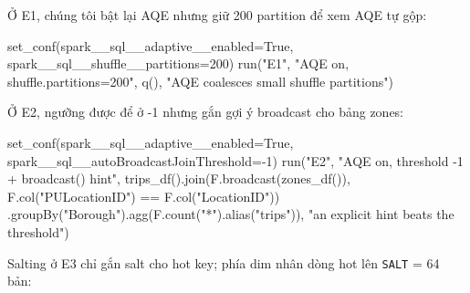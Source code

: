 \documentclass[
  12pt,
  a4paper,
]{article}
\newenvironment{Shaded}{}{}
\newcommand{\DecValTok}[1]{\textcolor[rgb]{0.25,0.63,0.44}{#1}}
\newcommand{\NormalTok}[1]{#1}
\newcommand{\OperatorTok}[1]{\textcolor[rgb]{0.40,0.40,0.40}{#1}}
\newcommand{\StringTok}[1]{\textcolor[rgb]{0.25,0.44,0.63}{#1}}
\newcommand{\VariableTok}[1]{\textcolor[rgb]{0.10,0.09,0.49}{#1}}
\begin{document}
Ở E1, chúng tôi bật lại AQE nhưng giữ 200 partition để xem AQE tự gộp:

\begin{Shaded}
\begin{Highlighting}[]
\NormalTok{set\_conf(spark\_\_sql\_\_adaptive\_\_enabled}\OperatorTok{=}\VariableTok{True}\NormalTok{, spark\_\_sql\_\_shuffle\_\_partitions}\OperatorTok{=}\DecValTok{200}\NormalTok{)}
\NormalTok{run(}\StringTok{"E1"}\NormalTok{, }\StringTok{"AQE on,  shuffle.partitions=200"}\NormalTok{, q(), }\StringTok{"AQE coalesces small shuffle partitions"}\NormalTok{)}
\end{Highlighting}
\end{Shaded}

Ở E2, ngưỡng được để ở -1 nhưng gắn gợi ý broadcast cho bảng zones:

\begin{Shaded}
\begin{Highlighting}[]
\NormalTok{set\_conf(spark\_\_sql\_\_adaptive\_\_enabled}\OperatorTok{=}\VariableTok{True}\NormalTok{, spark\_\_sql\_\_autoBroadcastJoinThreshold}\OperatorTok{={-}}\DecValTok{1}\NormalTok{)}
\NormalTok{run(}\StringTok{"E2"}\NormalTok{, }\StringTok{"AQE on,  threshold {-}1 + broadcast() hint"}\NormalTok{,}
\NormalTok{    trips\_df().join(F.broadcast(zones\_df()), F.col(}\StringTok{"PULocationID"}\NormalTok{) }\OperatorTok{==}\NormalTok{ F.col(}\StringTok{"LocationID"}\NormalTok{))}
\NormalTok{    .groupBy(}\StringTok{"Borough"}\NormalTok{).agg(F.count(}\StringTok{"*"}\NormalTok{).alias(}\StringTok{"trips"}\NormalTok{)),}
    \StringTok{"an explicit hint beats the threshold"}\NormalTok{)}
\end{Highlighting}
\end{Shaded}

Salting ở E3 chỉ gắn salt cho hot key; phía dim nhân dòng hot lên
\texttt{SALT} = 64 bản:
\end{document}

